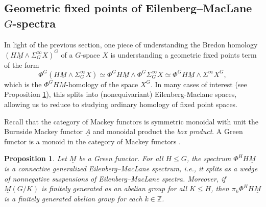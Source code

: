 \documentclass[11pt]{amsart}
\newtheorem{proposition}[equation]{Proposition}
\theoremstyle{definition}
\numberwithin{equation}{subsection} %
\def\z{\mathbb{Z}}
\def\cc{\mathcal{C}}
\def\cf{\mathcal{F}}
\def\uM{\underline{M}}
\def\uA{\underline{A}}
\def\uM{\underline{M}}
\newcommand{\sma}{\wedge}
\newcommand{\sus}{\Sigma}
\begin{document}

\subsection{Geometric fixed points of Eilenberg--MacLane $G$-spectra}\label{SS:GEM}

In light of the previous section, one piece of understanding the Bredon homology $(H\uM\sma \sus^\infty_GX)^G$ of a $G$-space $X$ is understanding a geometric fixed points term of the form
$$ \Phi^G(H\uM\sma \sus^\infty_GX) \simeq \Phi^G H\uM \sma \Phi^G \sus^\infty_GX \simeq \Phi^G H\uM \sma \sus^\infty X^G, $$ 
which is the $\Phi^G H\uM$-homology of the space $X^G$. In many cases of interest (see Proposition \ref{Prop:Green}), this splits into (nonequivariant) Eilenberg-Maclane spaces, allowing us to reduce to studying ordinary homology of fixed point spaces.

Recall that the category of Mackey functors is symmetric monoidal with unit the Burnside Mackey functor $\uA$ and monoidal product the \emph{box product}. A Green functor is a monoid in the category of Mackey functors \cite{lewis-green}.

\begin{proposition}\label{Prop:Green}
Let $\uM$ be a Green functor. For all $H \leq G$, the spectrum $\Phi^H H\uM$ is a connective generalized Eilenberg--MacLane spectrum, i.e., it splits as a wedge of nonnegative suspensions of Eilenberg--MacLane spectra. Moreover, if $\uM(G/K)$ is finitely generated as an abelian group for all $K \leq H$, then $\pi_k \Phi^H H\uM$ is a finitely generated abelian group for each $k \in \z$. 
\end{proposition}
\end{document}
